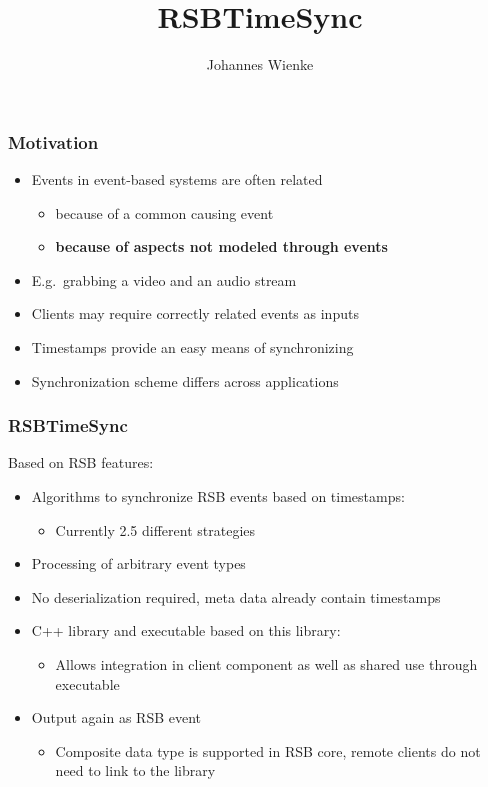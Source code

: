 \documentclass{beamer}
\title{RSBTimeSync}
\author{Johannes Wienke}
\institute{Bielefeld University}
\begin{document}
\begin{frame}
	\titlepage
\end{frame}

\begin{frame}
	\frametitle{Motivation}
	\begin{itemize}
        \item Events in event-based systems are often related
            \begin{itemize}
                \item because of a common causing event
                \item \textbf{because of aspects not modeled through events}
            \end{itemize}
        \item E.g.\ grabbing a video and an audio stream
        \item Clients may require correctly related events as inputs 
        \item Timestamps provide an easy means of synchronizing
        \item Synchronization scheme differs across applications
    \end{itemize}
\end{frame}

\begin{frame}
    \frametitle{RSBTimeSync}
    Based on RSB features:
    \begin{itemize}
        \item Algorithms to synchronize RSB events based on timestamps:
            \begin{itemize}
                \item Currently 2.5 different strategies
            \end{itemize}
        \item Processing of arbitrary event types
        \item No deserialization required, meta data already contain timestamps
        \item C++ library and executable based on this library:
            \begin{itemize}
                \item Allows integration in client component as well as shared use through executable
            \end{itemize}
        \item Output again as RSB event
            \begin{itemize}
                \item Composite data type is supported in RSB core, remote clients do not need to link to the library
            \end{itemize}
    \end{itemize}
\end{frame}
\end{document}
